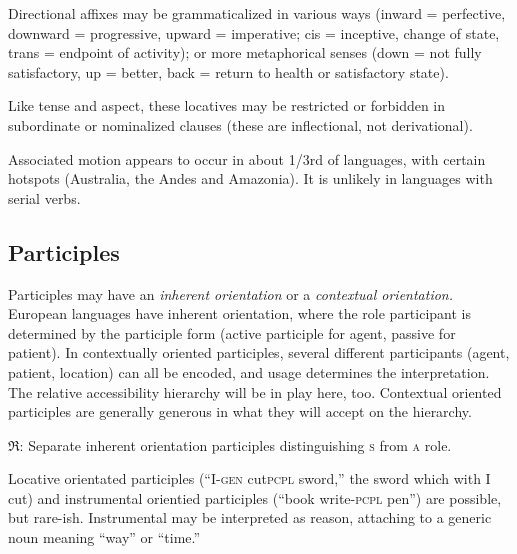 \documentclass[11pt]{article}
\newcommand{\I}[1]{\textsc{#1}}   %
\newcommand{\rara}[1]{$\mathfrak{R}$: #1}
\begin{document}
Directional affixes may be grammaticalized in various ways (inward =
perfective, downward = progressive, upward = imperative; cis =
inceptive, change of state, trans = endpoint of activity); or more
metaphorical senses (down = not fully satisfactory, up = better, back
= return to health or satisfactory state).

Like tense and aspect, these locatives may be restricted or forbidden
in subordinate or nominalized clauses (these are inflectional, not
derivational). 

Associated motion appears to occur in about 1/3rd of languages, with
certain hotspots (Australia, the Andes and Amazonia).  It is unlikely
in languages with serial verbs.


\subsection{Participles}
Participles may have an \textit{inherent orientation} or a
\textit{contextual orientation.}  European languages have inherent
orientation, where the role participant is determined by the
participle form (active participle for agent, passive for patient).
In contextually oriented participles, several different participants
(agent, patient, location) can all be encoded, and usage determines
the interpretation.  The relative accessibility hierarchy will be in
play here, too.  Contextual oriented participles are generally
generous in what they will accept on the hierarchy.

\rara{Separate inherent orientation participles distinguishing \I{s}
from \I{a} role.}

Locative orientated participles (``I-\I{gen} cut\I{pcpl} sword,'' the
sword which with I cut) and instrumental orientied participles (``book
write-\I{pcpl} pen'') are possible, but rare-ish.  Instrumental may be
interpreted as reason, attaching to a generic noun meaning ``way'' or
``time.''
\end{document}
